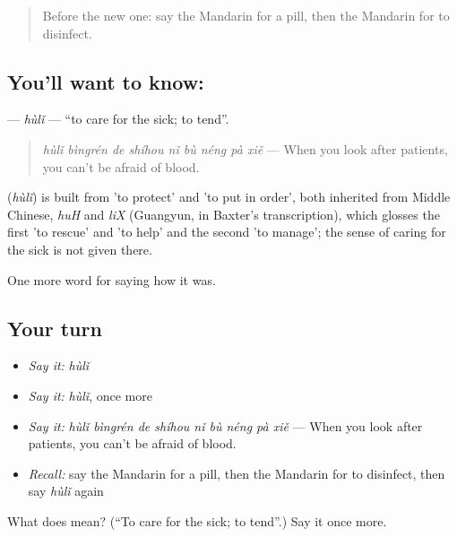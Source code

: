 \label{lesson:ZH-C482-huli}



\begin{quote}
Before the new one: say the Mandarin for a pill, then the Mandarin for to disinfect.
\end{quote}

\subsection*{You'll want to know: }
\textbf{} — \emph{hùlǐ} — \textquotedblleft{}to care for the sick; to tend\textquotedblright{}.

\begin{quote}
\textbf{} \emph{hùlǐ bìngrén de shíhou nǐ bù néng pà xiě} — When you look after patients, you can't be afraid of blood.
\end{quote}

\begin{cousinweb}
\textbf{} (\emph{hùlǐ}) is built from  'to protect' and  'to put in order', both inherited from Middle Chinese, \emph{huH} and \emph{liX} (Guangyun, in Baxter's transcription), which glosses the first 'to rescue' and 'to help' and the second 'to manage'; the sense of caring for the sick is not given there.
\end{cousinweb}

\begin{grammarlens}[title={What you've built}]
One more word for saying how it was.
\end{grammarlens}

\subsection*{Your turn}
\begin{itemize}
\raggedright
  \item \emph{Say it:} \emph{hùlǐ}
  \item \emph{Say it:} \emph{hùlǐ}, once more
  \item \emph{Say it:} \emph{hùlǐ bìngrén de shíhou nǐ bù néng pà xiě} — When you look after patients, you can't be afraid of blood.
  \item \emph{Recall:} say the Mandarin for a pill, then the Mandarin for to disinfect, then say \emph{hùlǐ} again
\end{itemize}

\begin{tcolorbox}[breakable,colback=teal!4,colframe=teal!35!black,title={Before you move on}]
What does  mean? (\textquotedblleft{}To care for the sick; to tend\textquotedblright{}.) Say it once more.
\end{tcolorbox}
